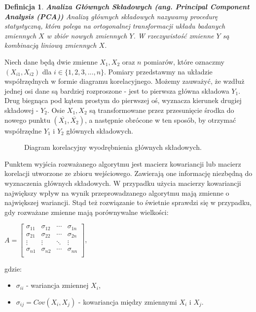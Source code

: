 \documentclass[12pt,a4paper]{report}
\newtheorem{df}{Definicja}[chapter]
\begin{document}
\begin{df}\textbf{Analiza Głównych Składowych (ang. Principal Component Analysis (PCA))}
Analizą głównych składowych nazywamy procedurę statystyczną, która polega na ortogonalnej transformacji układu badanych zmiennych $X$ w zbiór nowych zmiennych $Y$. W rzeczywistość zmienne $Y$ są kombinacją liniową zmiennych $X$.
\end{df}
Niech dane będą dwie zmienne $X_1, X_2$ oraz $n$ pomiarów, które oznaczmy $(X_{i1},X_{i2})$ dla $i \in \{1,2,3,...,n\}$. Pomiary przedstawmy na układzie współrzędnych w formie diagramu korelacyjnego. Możemy zauważyć, że wzdłuż jednej osi dane są bardziej rozproszone - jest to pierwsza główna składowa $Y_1$. Drug biegnąca pod kątem prostym do pierwszej oś, wyznacza kierunek drugiej składowej - $Y_2$. Osie $X_1, X_2$ są transformowane przez przesunięcie środka do nowego punktu $(\overline{X_1},\overline{X_2})$, a następnie obrócone w ten sposób, by otrzymać współrzędne $Y_1$ i $Y_2$ głównych składowych.
\begin{center}
\begin{figure}[H]
\centering
\caption{Diagram korelacyjny wyodrębnienia głównych składowych.}
\end{figure}
\end{center}
Punktem wyjścia rozważanego algorytmu jest macierz kowariancji lub macierz korelacji utworzone ze zbioru wejściowego. Zawierają one informację niezbędną do wyznaczenia głównych składowych.
W przypadku użycia macierzy kowariancji największy wpływ na wynik przeprowadzanego algorytmu mają zmienne o największej wariancji. Stąd też rozwiązanie to świetnie sprawdzi się w przypadku, gdy rozważane zmienne mają porównywalne wielkości: 
\begin{center}
$ A= \left[
        \begin{array}{cccc}
         \sigma_{11} & \sigma_{12} & \cdots & \sigma_{1n} \\
         \sigma_{21} & \sigma_{22} & \cdots & \sigma_{2n} \\
         \vdots & \vdots & \ddots & \vdots \\
         \sigma_{n1} & \sigma_{n2} & \cdots & \sigma_{nn}\\
         \end{array}
      \right]$, 
\end{center}
gdzie:
\begin{itemize}
\item $\sigma_{ii}$ - wariancja zmiennej $X_i$,
\item $\sigma_{ij}=Cov(X_i,X_j)$ - kowariancja między zmiennymi $X_i$ i $X_j$.
\end{itemize}
\end{document}
